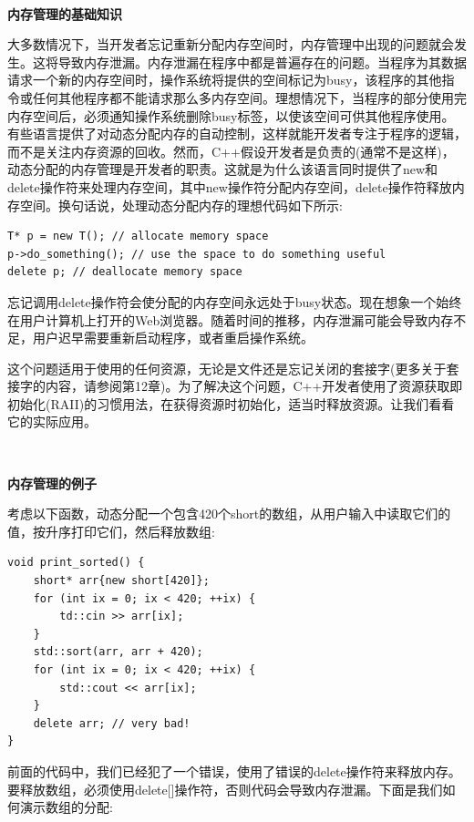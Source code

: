 \noindent\textbf{}\ \par
\textbf{内存管理的基础知识} \ \par
大多数情况下，当开发者忘记重新分配内存空间时，内存管理中出现的问题就会发生。这将导致内存泄漏。内存泄漏在程序中都是普遍存在的问题。当程序为其数据请求一个新的内存空间时，操作系统将提供的空间标记为busy，该程序的其他指令或任何其他程序都不能请求那么多内存空间。理想情况下，当程序的部分使用完内存空间后，必须通知操作系统删除busy标签，以使该空间可供其他程序使用。有些语言提供了对动态分配内存的自动控制，这样就能开发者专注于程序的逻辑，而不是关注内存资源的回收。然而，C++假设开发者是负责的(通常不是这样)，动态分配的内存管理是开发者的职责。这就是为什么该语言同时提供了new和delete操作符来处理内存空间，其中new操作符分配内存空间，delete操作符释放内存空间。换句话说，处理动态分配内存的理想代码如下所示: \par

\begin{lstlisting}[caption={}]
T* p = new T(); // allocate memory space
p->do_something(); // use the space to do something useful
delete p; // deallocate memory space
\end{lstlisting}

忘记调用delete操作符会使分配的内存空间永远处于busy状态。现在想象一个始终在用户计算机上打开的Web浏览器。随着时间的推移，内存泄漏可能会导致内存不足，用户迟早需要重新启动程序，或者重启操作系统。 \par
这个问题适用于使用的任何资源，无论是文件还是忘记关闭的套接字(更多关于套接字的内容，请参阅第12章)。为了解决这个问题，C++开发者使用了资源获取即初始化(RAII)的习惯用法，在获得资源时初始化，适当时释放资源。让我们看看它的实际应用。 \par

\noindent\textbf{}\ \par
\textbf{内存管理的例子} \ \par
考虑以下函数，动态分配一个包含420个short的数组，从用户输入中读取它们的值，按升序打印它们，然后释放数组: \par

\begin{lstlisting}[caption={}]
void print_sorted() {
	short* arr{new short[420]};
	for (int ix = 0; ix < 420; ++ix) {
		td::cin >> arr[ix];
	}
	std::sort(arr, arr + 420);
	for (int ix = 0; ix < 420; ++ix) {
		std::cout << arr[ix];
	}
	delete arr; // very bad!
}
\end{lstlisting}

前面的代码中，我们已经犯了一个错误，使用了错误的delete操作符来释放内存。要释放数组，必须使用delete[]操作符，否则代码会导致内存泄漏。下面是我们如何演示数组的分配: \par

